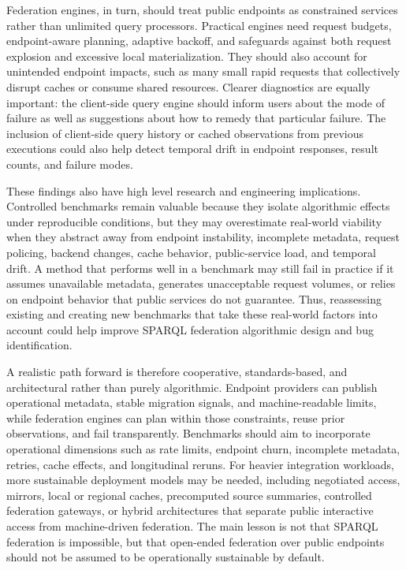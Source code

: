 \documentclass[runningheads]{llncs}
\begin{document}
Federation engines, in turn, should treat public endpoints as constrained services rather than unlimited query processors. 
Practical engines need request budgets, endpoint-aware planning, adaptive backoff, and safeguards against both request explosion and excessive local materialization. 
They should also account for unintended endpoint impacts, such as many small rapid requests that collectively disrupt caches or consume shared resources. 
Clearer diagnostics are equally important: the client-side query engine should inform users about the mode of failure as well as suggestions about how to remedy that particular failure. 
The inclusion of client-side query history or cached observations from previous executions could also help detect temporal drift in endpoint responses, result counts, and failure modes.

These findings also have high level research and engineering implications. 
Controlled benchmarks remain valuable because they isolate algorithmic effects under reproducible conditions, but they may overestimate real-world viability when they abstract away from endpoint instability, incomplete metadata, request policing, backend changes, cache behavior, public-service load, and temporal drift. 
A method that performs well in a benchmark may still fail in practice if it assumes unavailable metadata, generates unacceptable request volumes, or relies on endpoint behavior that public services do not guarantee.
Thus, reassessing existing and creating new benchmarks that take these real-world factors into account could help improve SPARQL federation algorithmic design and bug identification.

A realistic path forward is therefore cooperative, standards-based, and architectural rather than purely algorithmic. 
Endpoint providers can publish operational metadata, stable migration signals, and machine-readable limits, while federation engines can plan within those constraints, reuse prior observations, and fail transparently. 
Benchmarks should aim to incorporate operational dimensions such as rate limits, endpoint churn, incomplete metadata, retries, cache effects, and longitudinal reruns. 
For heavier integration workloads, more sustainable deployment models may be needed, including negotiated access, mirrors, local or regional caches, precomputed source summaries, controlled federation gateways, or hybrid architectures that separate public interactive access from machine-driven federation. 
The main lesson is not that SPARQL federation is impossible, but that open-ended federation over public endpoints should not be assumed to be operationally sustainable by default.
\end{document}
